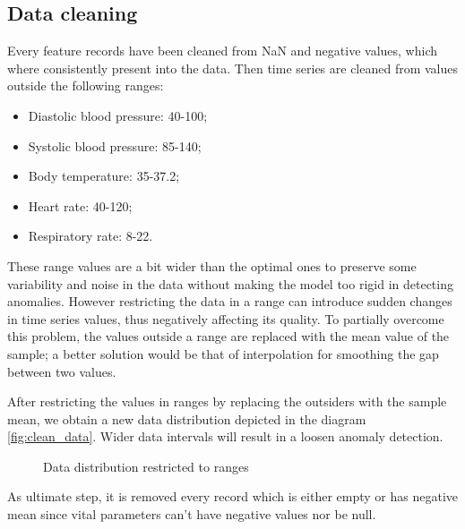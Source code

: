\documentclass{article}
\begin{document}
\begin{multicols*}{2}
\subsection{Data cleaning}
Every feature records have been cleaned from NaN and negative values, which where consistently present into the data. Then time series are cleaned from values outside the following ranges:
		\begin{itemize}
			\item Diastolic blood pressure: 40-100;
			\item Systolic blood pressure: 85-140;
			\item Body temperature: 35-37.2;
			\item Heart rate: 40-120;
			\item Respiratory rate: 8-22.
		\end{itemize}
These range values are a bit wider than the optimal ones to preserve some variability and noise in the data without making the model too rigid in detecting anomalies. However restricting the data in a range can introduce sudden changes in time series values, thus negatively affecting its quality. To partially overcome this problem, the values outside a range are replaced with the mean value of the sample; a better solution would be that of interpolation for smoothing the gap between two values.
		
After restricting the values in ranges by replacing the outsiders with the sample mean, we obtain a new data distribution depicted in the diagram \ref{fig:clean_data}. Wider data intervals will result in a loosen anomaly detection.
\begin{figure}[H]
			\centering
			\caption{Data distribution restricted to ranges}
\end{figure}
As ultimate step, it is removed every record which is either empty or has negative mean since vital parameters can't have negative values nor be null.
		

\end{multicols*}
\end{document}
